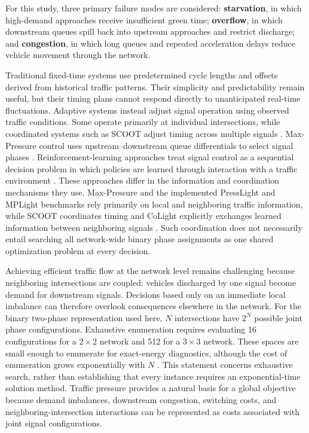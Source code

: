 For this study, three primary failure modes are considered: \textbf{starvation}, in which high-demand approaches receive insufficient green time; \textbf{overflow}, in which downstream queues spill back into upstream approaches and restrict discharge; and \textbf{congestion}, in which long queues and repeated acceleration delays reduce vehicle movement through the network.

Traditional fixed-time systems use predetermined cycle lengths and offsets derived from historical traffic patterns. Their simplicity and predictability remain useful, but their timing plans cannot respond directly to unanticipated real-time fluctuations. Adaptive systems instead adjust signal operation using observed traffic conditions. Some operate primarily at individual intersections, while coordinated systems such as SCOOT adjust timing across multiple signals \cite{hunt1981}. Max-Pressure control uses upstream--downstream queue differentials to select signal phases \cite{varaiya2013}. Reinforcement-learning approaches treat signal control as a sequential decision problem in which policies are learned through interaction with a traffic environment \cite{agrahari2024}. These approaches differ in the information and coordination mechanisms they use. Max-Pressure and the implemented PressLight and MPLight benchmarks rely primarily on local and neighboring traffic information, while SCOOT coordinates timing and CoLight explicitly exchanges learned information between neighboring signals \cite{hunt1981,wei2019presslight,chen2020mplight,wei2019colight}. Such coordination does not necessarily entail searching all network-wide binary phase assignments as one shared optimization problem at every decision.

Achieving efficient traffic flow at the network level remains challenging because neighboring intersections are coupled: vehicles discharged by one signal become demand for downstream signals. Decisions based only on an immediate local imbalance can therefore overlook consequences elsewhere in the network. For the binary two-phase representation used here, $N$ intersections have $2^N$ possible joint phase configurations. Exhaustive enumeration requires evaluating 16 configurations for a $2\times2$ network and 512 for a $3\times3$ network. These spaces are small enough to enumerate for exact-energy diagnostics, although the cost of enumeration grows exponentially with $N$ \cite{garey1979}. This statement concerns exhaustive search, rather than establishing that every instance requires an exponential-time solution method. Traffic pressure provides a natural basis for a global objective because demand imbalances, downstream congestion, switching costs, and neighboring-intersection interactions can be represented as costs associated with joint signal configurations.


